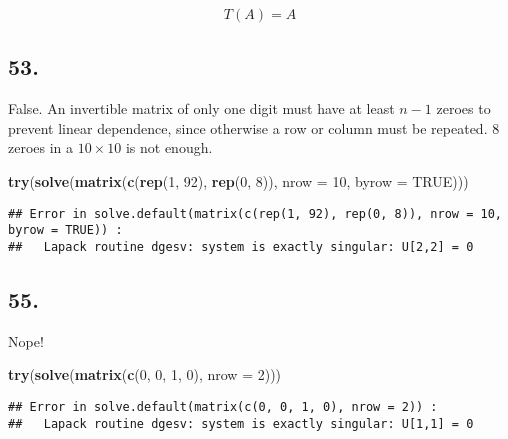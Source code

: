 \documentclass[]{article}
\newenvironment{Shaded}{\begin{snugshade}}{\end{snugshade}}
\newcommand{\DataTypeTok}[1]{\textcolor[rgb]{0.00,0.34,0.68}{#1}}
\newcommand{\DecValTok}[1]{\textcolor[rgb]{0.69,0.50,0.00}{#1}}
\newcommand{\KeywordTok}[1]{\textcolor[rgb]{0.12,0.11,0.11}{\textbf{#1}}}
\newcommand{\NormalTok}[1]{\textcolor[rgb]{0.12,0.11,0.11}{#1}}
\newcommand{\OtherTok}[1]{\textcolor[rgb]{0.00,0.43,0.16}{#1}}
\begin{document}
\[T(A)=A\]

\hypertarget{section-160}{%
\subsection{53.}\label{section-160}}

False. An invertible matrix of only one digit must have at least \(n-1\)
zeroes to prevent linear dependence, since otherwise a row or column
must be repeated. 8 zeroes in a \(10\times{10}\) is not enough.

\begin{Shaded}
\begin{Highlighting}[]
\KeywordTok{try}\NormalTok{(}\KeywordTok{solve}\NormalTok{(}\KeywordTok{matrix}\NormalTok{(}\KeywordTok{c}\NormalTok{(}\KeywordTok{rep}\NormalTok{(}\DecValTok{1}\NormalTok{, }\DecValTok{92}\NormalTok{), }\KeywordTok{rep}\NormalTok{(}\DecValTok{0}\NormalTok{, }\DecValTok{8}\NormalTok{)), }\DataTypeTok{nrow =} \DecValTok{10}\NormalTok{, }\DataTypeTok{byrow =} \OtherTok{TRUE}\NormalTok{)))}
\end{Highlighting}
\end{Shaded}

\begin{verbatim}
## Error in solve.default(matrix(c(rep(1, 92), rep(0, 8)), nrow = 10, byrow = TRUE)) : 
##   Lapack routine dgesv: system is exactly singular: U[2,2] = 0
\end{verbatim}

\hypertarget{section-161}{%
\subsection{55.}\label{section-161}}

Nope!

\begin{Shaded}
\begin{Highlighting}[]
\KeywordTok{try}\NormalTok{(}\KeywordTok{solve}\NormalTok{(}\KeywordTok{matrix}\NormalTok{(}\KeywordTok{c}\NormalTok{(}\DecValTok{0}\NormalTok{, }\DecValTok{0}\NormalTok{, }\DecValTok{1}\NormalTok{, }\DecValTok{0}\NormalTok{), }\DataTypeTok{nrow =} \DecValTok{2}\NormalTok{)))}
\end{Highlighting}
\end{Shaded}

\begin{verbatim}
## Error in solve.default(matrix(c(0, 0, 1, 0), nrow = 2)) : 
##   Lapack routine dgesv: system is exactly singular: U[1,1] = 0
\end{verbatim}
\end{document}
